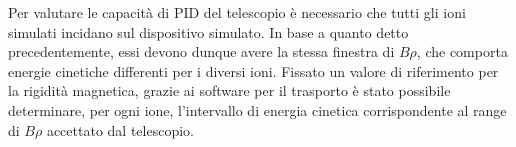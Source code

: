 Per valutare le capacità di PID del telescopio è necessario che tutti gli ioni simulati incidano sul dispositivo simulato. 
In base a quanto detto precedentemente, essi devono dunque avere la stessa finestra di $B \rho$, che comporta energie cinetiche differenti per i diversi ioni. 
Fissato un valore di riferimento per la rigidità magnetica, grazie ai software per il trasporto è stato possibile determinare, per ogni ione, l'intervallo di energia cinetica corrispondente al range di $B \rho$ accettato dal telescopio.









